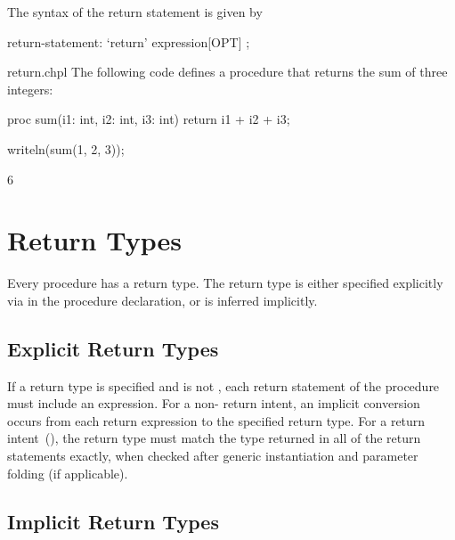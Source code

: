 The syntax of the return statement is given by
\begin{syntax}
return-statement:
  `return' expression[OPT] ;
\end{syntax}

\begin{chapelexample}{return.chpl}
The following code defines a procedure that returns the sum of three
integers:
\begin{chapel}
proc sum(i1: int, i2: int, i3: int)
  return i1 + i2 + i3;
\end{chapel}
\begin{chapelpost}
writeln(sum(1, 2, 3));
\end{chapelpost}
\begin{chapeloutput}
6
\end{chapeloutput}
\end{chapelexample}


\section{Return Types}
\label{Return_Types}

Every procedure has a return type. The return type is either
specified explicitly via  in the procedure
declaration, or is inferred implicitly.


\subsection{Explicit Return Types}
\label{Explicit_Return_Types}

If a return type is specified and is not ,
each return statement of the procedure must include an expression.
For a non- return intent, an implicit conversion occurs
from each return expression to the specified return type.
For a  return intent~(), the return
type must match the type returned in all of the return statements
exactly, when checked after generic instantiation and parameter folding
(if applicable).

\subsection{Implicit Return Types}
\label{Implicit_Return_Types}

